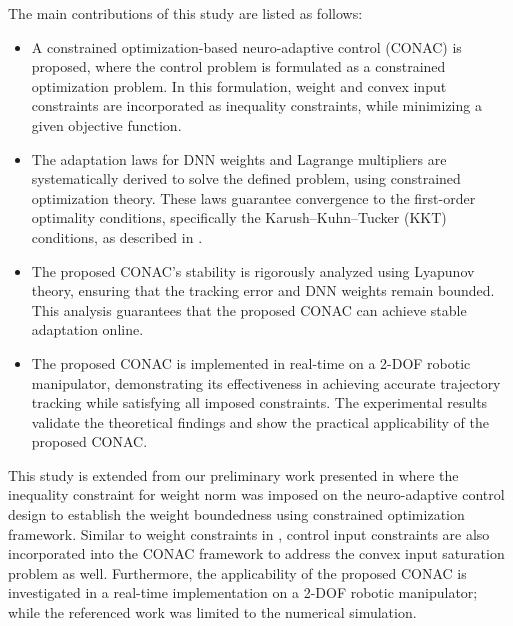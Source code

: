 \documentclass[journal]{IEEEtran}
\begin{document}
The main contributions of this study are listed as follows:
\begin{itemize}
    \item A constrained optimization-based neuro-adaptive control (CONAC) is proposed, where the control problem is formulated as a constrained optimization problem. In this formulation, weight and convex input constraints are incorporated as inequality constraints, while minimizing a given objective function.
    \item The adaptation laws for DNN weights and Lagrange multipliers are systematically derived to solve the defined problem, using constrained optimization theory. These laws guarantee convergence to the first-order optimality conditions, specifically the Karush–Kuhn–Tucker (KKT) conditions, as described in \cite[Chap. 12, Thm. 12.1]{Nocedal:2006aa}.
    \item The proposed CONAC's stability is rigorously analyzed using Lyapunov theory, ensuring that the tracking error and DNN weights remain bounded. This analysis guarantees that the proposed CONAC can achieve stable adaptation online.
    \item The proposed CONAC is implemented in real-time on a 2-DOF robotic manipulator, demonstrating its effectiveness in achieving accurate trajectory tracking while satisfying all imposed constraints. The experimental results validate the theoretical findings and show the practical applicability of the proposed CONAC.
\end{itemize}

\hfill

This study is extended from our preliminary work presented in \cite{Ryu:2024aa} where the inequality constraint for weight norm was imposed on the neuro-adaptive control design to establish the weight boundedness using constrained optimization framework.
Similar to weight constraints in \cite{Ryu:2024aa}, control input constraints are also incorporated into the CONAC framework to address the convex input saturation problem as well.
Furthermore, the applicability of the proposed CONAC is investigated in a real-time implementation on a 2-DOF robotic manipulator; while the referenced work was limited to the numerical simulation.
\end{document}
